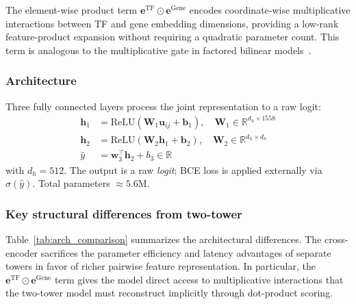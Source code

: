 \documentclass[10pt,twocolumn]{article}
\begin{document}
The element-wise product term $\mathbf{e}^{\text{TF}} \odot \mathbf{e}^{\text{Gene}}$
encodes coordinate-wise multiplicative interactions between TF and gene
embedding dimensions, providing a low-rank feature-product expansion without
requiring a quadratic parameter count.
This term is analogous to the multiplicative gate in factored bilinear models~\cite{yang2015embedding}.

\subsubsection{Architecture}
Three fully connected layers process the joint representation to a raw logit:
\begin{align}
    \mathbf{h}_1 &= \text{ReLU}(\mathbf{W}_1 \mathbf{u}_{ij} + \mathbf{b}_1), \quad
    \mathbf{W}_1 \in \mathbb{R}^{d_h \times 1558} \\
    \mathbf{h}_2 &= \text{ReLU}(\mathbf{W}_2 \mathbf{h}_1 + \mathbf{b}_2), \quad
    \mathbf{W}_2 \in \mathbb{R}^{d_h \times d_h} \\
    \hat{y} &= \mathbf{w}_3^\top \mathbf{h}_2 + b_3 \in \mathbb{R}
    \label{eq:cross_logit}
\end{align}
with $d_h = 512$.
The output is a raw \emph{logit}; BCE loss is applied externally via
$\sigma(\hat{y})$.
Total parameters $\approx 5.6\mathrm{M}$.

\subsubsection{Key structural differences from two-tower}
Table~\ref{tab:arch_comparison} summarizes the architectural differences.
The cross-encoder sacrifices the parameter efficiency and latency advantages
of separate towers in favor of richer pairwise feature representation.
In particular, the $\mathbf{e}^{\text{TF}} \odot \mathbf{e}^{\text{Gene}}$ term
gives the model direct access to multiplicative interactions that the two-tower
model must reconstruct implicitly through dot-product scoring.
\end{document}
